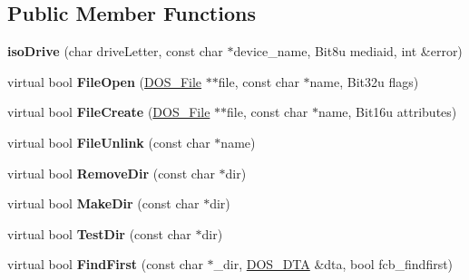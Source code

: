 \subsection*{Public Member Functions}
\begin{DoxyCompactItemize}
\item 
\hypertarget{classisoDrive_a20439a5153dde920714e63d31d5d5cca}{{\bfseries iso\-Drive} (char drive\-Letter, const char $\ast$device\-\_\-name, Bit8u mediaid, int \&error)}\label{classisoDrive_a20439a5153dde920714e63d31d5d5cca}

\item 
\hypertarget{classisoDrive_adee4a9f8024d338c0edb2273e9847d15}{virtual bool {\bfseries File\-Open} (\hyperlink{classDOS__File}{D\-O\-S\-\_\-\-File} $\ast$$\ast$file, const char $\ast$name, Bit32u flags)}\label{classisoDrive_adee4a9f8024d338c0edb2273e9847d15}

\item 
\hypertarget{classisoDrive_ae5ffb49ab032de84f6b76b56caac59f6}{virtual bool {\bfseries File\-Create} (\hyperlink{classDOS__File}{D\-O\-S\-\_\-\-File} $\ast$$\ast$file, const char $\ast$name, Bit16u attributes)}\label{classisoDrive_ae5ffb49ab032de84f6b76b56caac59f6}

\item 
\hypertarget{classisoDrive_aa97512db7a6a47362a274bfe1fb3e04b}{virtual bool {\bfseries File\-Unlink} (const char $\ast$name)}\label{classisoDrive_aa97512db7a6a47362a274bfe1fb3e04b}

\item 
\hypertarget{classisoDrive_a2e45d1a03e04d47ffc06af59cad20075}{virtual bool {\bfseries Remove\-Dir} (const char $\ast$dir)}\label{classisoDrive_a2e45d1a03e04d47ffc06af59cad20075}

\item 
\hypertarget{classisoDrive_a65564ef88771889a90341d50185b3b63}{virtual bool {\bfseries Make\-Dir} (const char $\ast$dir)}\label{classisoDrive_a65564ef88771889a90341d50185b3b63}

\item 
\hypertarget{classisoDrive_a7eaff803896a019a60e3956ffdf4ccf7}{virtual bool {\bfseries Test\-Dir} (const char $\ast$dir)}\label{classisoDrive_a7eaff803896a019a60e3956ffdf4ccf7}

\item 
\hypertarget{classisoDrive_a3eafe6819c2584d87e9dcdc65ff436b7}{virtual bool {\bfseries Find\-First} (const char $\ast$\-\_\-dir, \hyperlink{classDOS__DTA}{D\-O\-S\-\_\-\-D\-T\-A} \&dta, bool fcb\-\_\-findfirst)}\label{classisoDrive_a3eafe6819c2584d87e9dcdc65ff436b7}


\end{DoxyCompactItemize}
